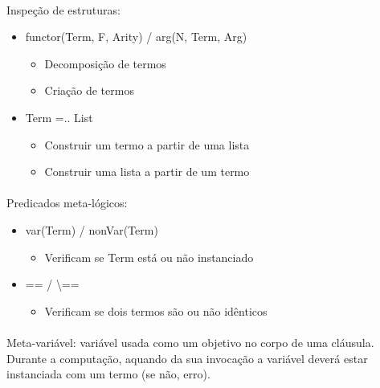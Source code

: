 \documentclass[../resumosPLOG.tex]{subfiles}
\begin{document}
\paragraph{}

Inspeção de estruturas:
\begin{itemize}
    \item functor(Term, F, Arity) / arg(N, Term, Arg)
    \begin{itemize}
        \item Decomposição de termos
        \item Criação de termos
    \end{itemize}
    \item Term =.. List
    \begin{itemize}
        \item Construir um termo a partir de uma lista
        \item Construir uma lista a partir de um termo
    \end{itemize}
\end{itemize}

\paragraph{}

Predicados meta-lógicos:
\begin{itemize}
    \item var(Term) / nonVar(Term)
    \begin{itemize}
        \item Verificam se Term está ou não instanciado
    \end{itemize}
    \item == / \textbackslash==
    \begin{itemize}
        \item Verificam se dois termos são ou não idênticos
    \end{itemize}
\end{itemize}

\paragraph{}

Meta-variável: variável usada como um objetivo no corpo de uma cláusula. Durante a computação, aquando da sua invocação a variável deverá estar instanciada com um termo (se não, erro).

\paragraph{}
\end{document}
